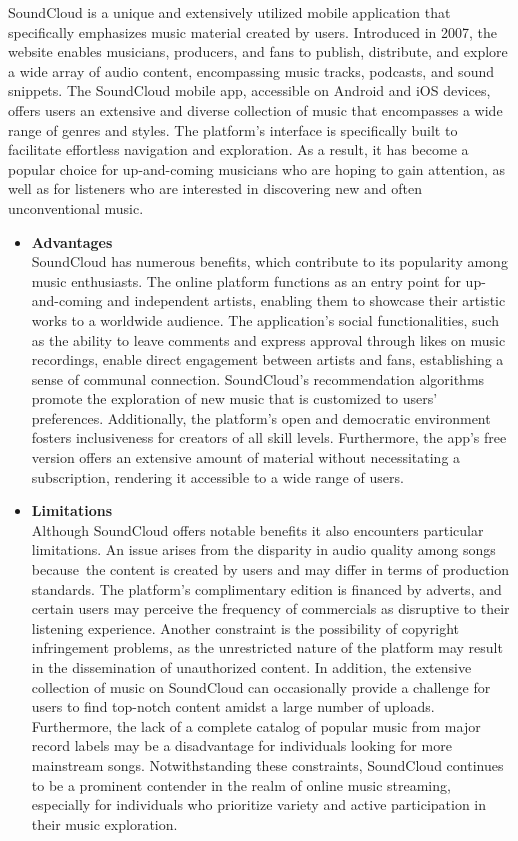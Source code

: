 SoundCloud is a unique and extensively utilized mobile application that specifically emphasizes music material created by users. Introduced in 2007, the website enables musicians, producers, and fans to publish, distribute, and explore a wide array of audio content, encompassing music tracks, podcasts, and sound snippets. The SoundCloud mobile app, accessible on Android and iOS devices, offers users an extensive and diverse collection of music that encompasses a wide range of genres and styles. The platform's interface is specifically built to facilitate effortless navigation and exploration. As a result, it has become a popular choice for up-and-coming musicians who are hoping to gain attention, as well as for listeners who are interested in discovering new and often unconventional music. \pagebreak
\begin{itemize}[\label{}]
    \item \textbf{Advantages} \\
    SoundCloud has numerous benefits, which contribute to its popularity among music enthusiasts. The online platform functions as an entry point for up-and-coming and independent artists, enabling them to showcase their artistic works to a worldwide audience. The application's social functionalities, such as the ability to leave comments and express approval through likes on music recordings, enable direct engagement between artists and fans, establishing a sense of communal connection. SoundCloud's recommendation algorithms promote the exploration of new music that is customized to users' preferences. Additionally, the platform's open and democratic environment fosters inclusiveness for creators of all skill levels. Furthermore, the app's free version offers an extensive amount of material without necessitating a subscription, rendering it accessible to a wide range of users.
    \item \textbf{Limitations} \\
    Although SoundCloud offers notable benefits it also encounters particular limitations. An issue arises from the disparity in audio quality among songs because the content is created by users and may differ in terms of production standards. The platform's complimentary edition is financed by adverts, and certain users may perceive the frequency of commercials as disruptive to their listening experience. Another constraint is the possibility of copyright infringement problems, as the unrestricted nature of the platform may result in the dissemination of unauthorized content. In addition, the extensive collection of music on SoundCloud can occasionally provide a challenge for users to find top-notch content amidst a large number of uploads. Furthermore, the lack of a complete catalog of popular music from major record labels may be a disadvantage for individuals looking for more mainstream songs. Notwithstanding these constraints, SoundCloud continues to be a prominent contender in the realm of online music streaming, especially for individuals who prioritize variety and active participation in their music exploration.
\end{itemize}
\pagebreak

